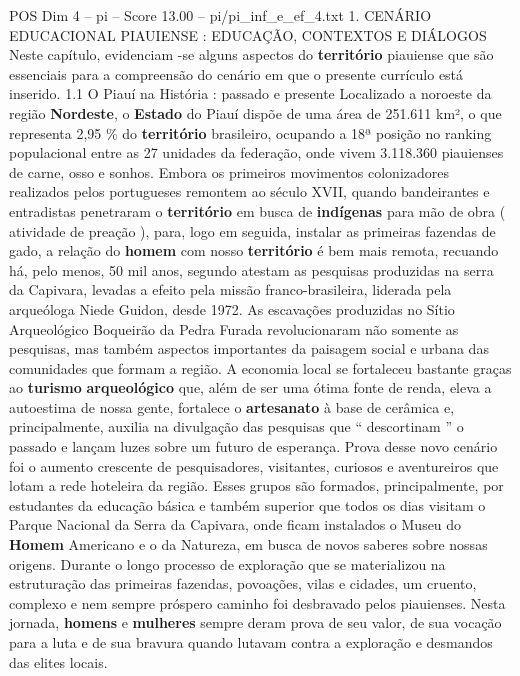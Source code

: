 \begin{textsample}{POS Dim 4 – pi – Score 13.00 – pi/pi\_inf\_e\_ef\_4.txt}  \label{ex:f4_pos_122}
1.
CENÁRIO EDUCACIONAL PIAUIENSE : EDUCAÇÃO, CONTEXTOS E DIÁLOGOS Neste capítulo, evidenciam -se alguns aspectos do \textbf{território} piauiense que são essenciais para a compreensão do cenário em que o presente currículo está inserido. 1.1 O Piauí na História : passado e presente Localizado a noroeste da região \textbf{Nordeste}, o \textbf{Estado} do Piauí dispõe de uma área de 251.611 km², o que representa 2,95 \% do \textbf{território} brasileiro, ocupando a 18ª posição no ranking populacional entre as 27 unidades da federação, onde vivem 3.118.360 piauienses de carne, osso e sonhos.
Embora os primeiros movimentos colonizadores realizados pelos portugueses remontem ao século XVII, quando bandeirantes e entradistas penetraram o \textbf{território} em busca de \textbf{indígenas} para mão de obra ( atividade de preação ), para, logo em seguida, instalar as primeiras fazendas de gado, a relação do \textbf{homem} com nosso \textbf{território} é bem mais remota, recuando há, pelo menos, 50 mil anos, segundo atestam as pesquisas produzidas na serra da Capivara, levadas a efeito pela missão franco-brasileira, liderada pela arqueóloga Niede Guidon, desde 1972.
As escavações produzidas no Sítio Arqueológico Boqueirão da Pedra Furada revolucionaram não somente as pesquisas, mas também aspectos importantes da paisagem social e urbana das comunidades que formam a região.
A economia local se fortaleceu bastante graças ao \textbf{turismo} \textbf{arqueológico} que, além de ser uma ótima fonte de renda, eleva a autoestima de nossa gente, fortalece o \textbf{artesanato} à base de cerâmica e, principalmente, auxilia na divulgação das pesquisas que “ descortinam ” o passado e lançam luzes sobre um futuro de esperança.
Prova desse novo cenário foi o aumento crescente de pesquisadores, visitantes, curiosos e aventureiros que lotam a rede hoteleira da região.
Esses grupos são formados, principalmente, por estudantes da educação básica e também superior que todos os dias visitam o Parque Nacional da Serra da Capivara, onde ficam instalados o Museu do \textbf{Homem} Americano e o da Natureza, em busca de novos saberes sobre nossas origens.
Durante o longo processo de exploração que se materializou na estruturação das primeiras fazendas, povoações, vilas e cidades, um cruento, complexo e nem sempre próspero caminho foi desbravado pelos piauienses.
Nesta jornada, \textbf{homens} e \textbf{mulheres} sempre deram prova de seu valor, de sua vocação para a luta e de sua bravura quando lutavam contra a exploração e desmandos das elites locais.

\end{textsample}
